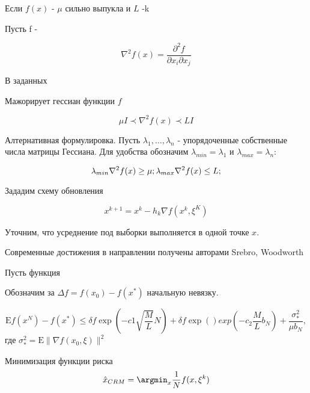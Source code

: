 

Если $f(x)$ - $\mu$ сильно выпукла и $L$ -k

Пусть f - 

\begin{equation}
    \nabla^2 f(x) = \frac{\partial^2 f}{\partial x_i \partial x_j} 
\end{equation}

В заданных 




Мажорирует гессиан функции $f$

\begin{equation}
    \mu I \prec \nabla^2 f(x) \prec L I 
\end{equation}

Алтернативная формулировка. Пусть $\lambda_1, \dots, \lambda_n$ - упорядоченные собственные числа матрицы Гессиана. Для удобства обозначим
$\lambda_{min} = \lambda_1$ и $\lambda_{max} = \lambda_n$:

\begin{equation}
    \lambda_{min} \nabla^2 f(x) \ge \mu; \\
    \lambda_{max} \nabla^2 f(x) \le L;
\end{equation}

Зададим схему обновления 

\begin{equation}
    x^{k+1} = x^k - h_k \nabla f(x^k, \xi^K)
\end{equation}



Уточним, что усреднение под выборки выполняется в одной точке $x$.

Современные достижения в направлении получены авторами Srebro, Woodworth \cite{NEURIPS2021_3c63ec7b} \cite{woodworth2016tight}

 Пусть функция 


Обозначим за $\Delta f = f(x_0) - f(x^*)$ начальную невязку. 

\begin{equation}
    \mathrm{E} f(x^N) -f(x^*) \le 
    \delta f \exp\left(-c1 \sqrt{\frac{M}{L}} N \right) + 
    \delta f \exp\left(\right) exp(-c_2 \frac{M}{L} b_N) +
    \frac{\sigma^2_*}{\mu b_N},
\end{equation}
где $\sigma^2_* = \mathrm{E} \|\nabla f(x_0,\xi) \|^2$


Минимизация функции риска
$$
    \hat{x}_{CRM} = \argmin_x \frac{1}{N} f(x,\xi^k)
$$
\cite{duchi2021asymptotic}